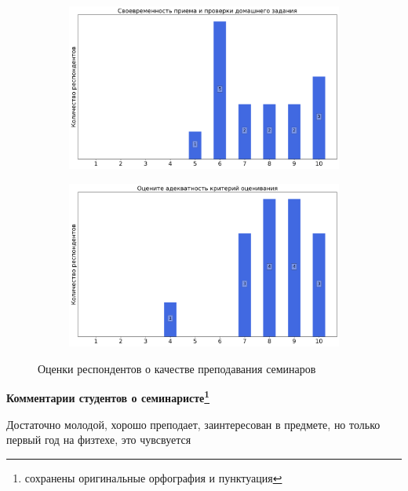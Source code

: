 \begin{figure}[H]
\begin{subfigure}[b]{0.45\textwidth}
                \includegraphics[width=\textwidth]{images/3 course/Вычислительная математика/seminarists-marks-Конев С.А.-2.png}
            \end{subfigure}
            \begin{subfigure}[b]{0.45\textwidth}
                \centering
                \includegraphics[width=\textwidth]{images/3 course/Вычислительная математика/seminarists-marks-Конев С.А.-3.png}
            \end{subfigure}	
            \caption{Оценки респондентов о качестве преподавания семинаров}
        \end{figure}

        \textbf{Комментарии студентов о семинаристе\protect\footnote{сохранены оригинальные орфография и пунктуация}}
            \begin{commentbox} 
                Достаточно молодой, хорошо преподает, заинтересован в предмете, но только первый год на физтехе, это чувсвуется 
            \end{commentbox} 

